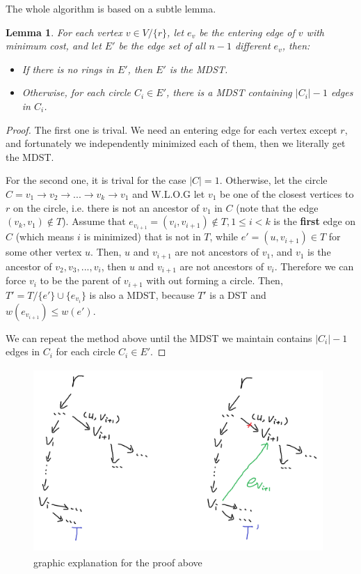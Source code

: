 \documentclass{article}
\newtheorem{lemma}{Lemma}
\begin{document}
The whole algorithm is based on a subtle lemma.

\begin{lemma}
    For each vertex $v\in V/\{r\}$, let $e_v$ be the entering edge of $v$ with minimum cost, and let $E'$ be the edge set of all $n-1$ different $e_v$, then:
    \begin{itemize}
        \item [1.] If there is no rings in $E'$, then $E'$ is the MDST.
        \item [2.] Otherwise, for each circle $C_i\in E'$, there is a MDST containing $|C_i|-1$ edges in $C_i$.
    \end{itemize}
\end{lemma}

\begin{proof}
    The first one is trival. We need an entering edge for each vertex except $r$, and fortunately we independently minimized each of them, then we literally get the MDST.

    For the second one, it is trival for the case $|C|=1$. Otherwise, let the circle $C=v_1\to v_2\to...\to v_k\to v_1$ and W.L.O.G let $v_1$ be one of the closest vertices to $r$ on the circle, i.e. there is not an ancestor of $v_1$ in $C$ (note that the edge $(v_k,v_1)\not\in T$). Assume that $e_{v_{i+1}}=(v_i,v_{i+1})\not\in T, 1\le i<k$ is the \textbf{first} edge on $C$ (which means $i$ is minimized) that is not in $T$, while $e'=(u,v_{i+1})\in T$ for some other vertex $u$. Then, $u$ and $v_{i+1}$ are not ancestors of $v_1$, and $v_1$ is the ancestor of $v_2,v_3,...,v_i$, then $u$ and $v_{i+1}$ are not ancestors of $v_i$. Therefore we can force $v_i$ to be the parent of $v_{i+1}$ with out forming a circle. Then, $T'=T/\{e'\}\cup\{e_{v_i}\}$ is also a MDST, because $T'$ is a DST and $w(e_{v_{i+1}})\le w(e')$.

    We can repeat the method above until the MDST we maintain contains $|C_i|-1$ edges in $C_i$ for each circle $C_i\in E'$.
\end{proof}

\begin{figure}
    \centering
    \includegraphics[height=7cm,width=11cm]{figure/figure1.png}
    \caption{graphic explanation for the proof above}
    \label{1}
\end{figure}
\end{document}
